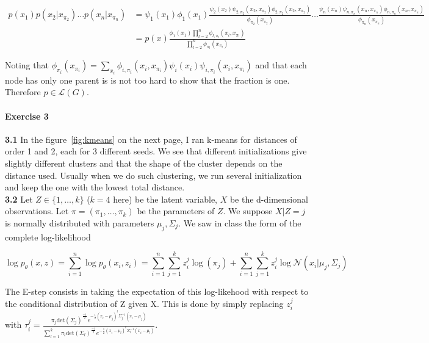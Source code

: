 \documentclass[a4paper, 11pt]{article}
\begin{document}
\begin{align*}
  p(x_1) p(x_2|x_{\pi_2}) \dots p(x_n|x_{\pi_n}) &= \psi_1(x_1) \phi_1(x_1) \frac{\psi_2(x_2)\psi_{2, \pi_2}(x_2,
  x_{\pi_2}) \phi_{2, \pi_2}(x_2, x_{\pi_2})}{\phi_{\pi_2}(x_{\pi_2})} \dots 
  \frac{\psi_n(x_n)\psi_{n, \pi_n}(x_n, x_{\pi_n}) \phi_{n, \pi_n}(x_n, x_{\pi_n})}{\phi_{\pi_n}(x_{\pi_n})} \\ 
  &= p(x) \frac{\phi_1(x_1) \prod_{l=2}^n \phi_{l, \pi_l}(x_l, x_{\pi_l})}{\prod_{l=2}^n \phi_{\pi_l}(x_{\pi_l})}
\end{align*}

Noting that $\phi_{\pi_i}(x_{\pi_i}) = \sum_{x_i} \phi_{i, \pi_i}(x_i, x_{\pi_i}) \psi_i(x_i) \psi_{i, \pi_i}(x_i,
x_{\pi_i})$ and that each node has only one parent is is not too hard to show that the fraction is one. \\

Therefore $p \in \mathcal{L}(G)$.

\clearpage

\paragraph{Exercise 3}

\textbf{3.1} In the figure~\ref{fig:kmeans} on the next page,
I ran k-means for distances of order 1 and 2, each for 3 different seeds. We see that different initializations give
slightly different clusters and that the shape of the cluster depends on the distance used. Usually when we do such
clustering, we run several initialization and keep the one with the lowest total distance.\\

\textbf{3.2} Let $Z \in \{1, \dots, k\}$ ($k=4$ here) be the latent variable, $X$ be the d-dimensional observations. Let $\pi = (\pi_1,
\dots, \pi_k)$ be the parameters of $Z$. We suppose $X|Z=j$ is normally distributed with parameters $\mu_j, \Sigma_j$.
We saw in class the form of the complete log-likelihood

\begin{equation}
\log p_{\theta}(x,z) = \sum_{i=1}^n \log p_{\theta}(x_i,z_i) = \sum_{i=1}^n \sum_{j=1}^k z_i^j \log(\pi_j) +
\sum_{i=1}^n \sum_{j=1}^k z_i^j \log \mathcal{N}(x_i|\mu_j, \Sigma_j)
\end{equation}

The E-step consists in taking the expectation of this log-likehood with respect to the conditional distribution of Z
given X. This is done by simply replacing $z_i^j$ with $\tau_i^j = \frac{\pi_j \text{det}(\Sigma_j)^{\frac{-1}{2}}
e^{-\frac{1}{2}(x_i-\mu_j)^t \Sigma_j^{-1} (x_i-\mu_j)}}{\sum_{l=1}^k \pi_l \text{det}(\Sigma_l)^{\frac{-1}{2}} 
e^{-\frac{1}{2}(x_i-\mu_l)^t \Sigma_l^{-1} (x_i-\mu_l)}}$. 
\end{document}
